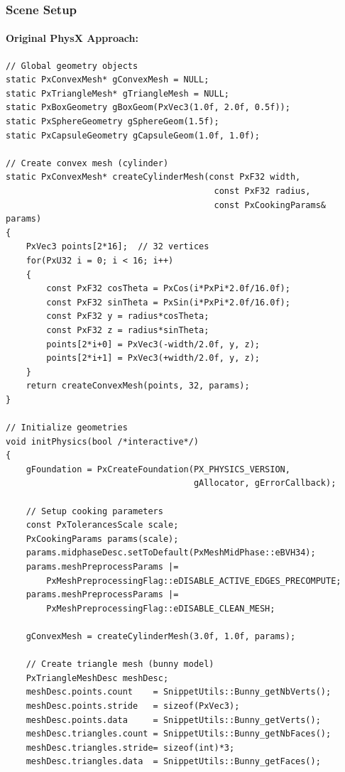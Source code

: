 \subsubsection{Scene Setup}

\paragraph{Original PhysX Approach:}

\begin{lstlisting}[style=cpp, caption=Original Geometry Creation]
// Global geometry objects
static PxConvexMesh* gConvexMesh = NULL;
static PxTriangleMesh* gTriangleMesh = NULL;
static PxBoxGeometry gBoxGeom(PxVec3(1.0f, 2.0f, 0.5f));
static PxSphereGeometry gSphereGeom(1.5f);
static PxCapsuleGeometry gCapsuleGeom(1.0f, 1.0f);

// Create convex mesh (cylinder)
static PxConvexMesh* createCylinderMesh(const PxF32 width,
                                         const PxF32 radius,
                                         const PxCookingParams& params)
{
    PxVec3 points[2*16];  // 32 vertices
    for(PxU32 i = 0; i < 16; i++)
    {
        const PxF32 cosTheta = PxCos(i*PxPi*2.0f/16.0f);
        const PxF32 sinTheta = PxSin(i*PxPi*2.0f/16.0f);
        const PxF32 y = radius*cosTheta;
        const PxF32 z = radius*sinTheta;
        points[2*i+0] = PxVec3(-width/2.0f, y, z);
        points[2*i+1] = PxVec3(+width/2.0f, y, z);
    }
    return createConvexMesh(points, 32, params);
}

// Initialize geometries
void initPhysics(bool /*interactive*/)
{
    gFoundation = PxCreateFoundation(PX_PHYSICS_VERSION,
                                     gAllocator, gErrorCallback);

    // Setup cooking parameters
    const PxTolerancesScale scale;
    PxCookingParams params(scale);
    params.midphaseDesc.setToDefault(PxMeshMidPhase::eBVH34);
    params.meshPreprocessParams |=
        PxMeshPreprocessingFlag::eDISABLE_ACTIVE_EDGES_PRECOMPUTE;
    params.meshPreprocessParams |=
        PxMeshPreprocessingFlag::eDISABLE_CLEAN_MESH;

    gConvexMesh = createCylinderMesh(3.0f, 1.0f, params);

    // Create triangle mesh (bunny model)
    PxTriangleMeshDesc meshDesc;
    meshDesc.points.count    = SnippetUtils::Bunny_getNbVerts();
    meshDesc.points.stride   = sizeof(PxVec3);
    meshDesc.points.data     = SnippetUtils::Bunny_getVerts();
    meshDesc.triangles.count = SnippetUtils::Bunny_getNbFaces();
    meshDesc.triangles.stride= sizeof(int)*3;
    meshDesc.triangles.data  = SnippetUtils::Bunny_getFaces();


\end{lstlisting}
